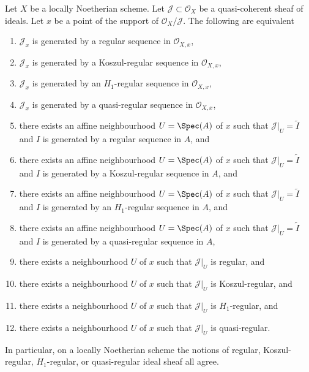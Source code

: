 \begin{lemma}
\label{lemma-Noetherian-scheme-regular-ideal}
Let $X$ be a locally Noetherian scheme. Let $\mathcal{J} \subset \mathcal{O}_X$
be a quasi-coherent sheaf of ideals. Let $x$ be a point of the support of
$\mathcal{O}_X/\mathcal{J}$. The following are equivalent
\begin{enumerate}
\item $\mathcal{J}_x$ is generated by a regular sequence in
$\mathcal{O}_{X, x}$,
\item $\mathcal{J}_x$ is generated by a Koszul-regular sequence in
$\mathcal{O}_{X, x}$,
\item $\mathcal{J}_x$ is generated by an $H_1$-regular sequence in
$\mathcal{O}_{X, x}$,
\item $\mathcal{J}_x$ is generated by a quasi-regular sequence in
$\mathcal{O}_{X, x}$,
\item there exists an affine neighbourhood $U = \Spec(A)$ of $x$ such
that $\mathcal{J}|_U = \widetilde{I}$ and $I$ is generated by a
regular sequence in $A$, and
\item there exists an affine neighbourhood $U = \Spec(A)$ of $x$ such
that $\mathcal{J}|_U = \widetilde{I}$ and $I$ is generated by a
Koszul-regular sequence in $A$, and
\item there exists an affine neighbourhood $U = \Spec(A)$ of $x$ such
that $\mathcal{J}|_U = \widetilde{I}$ and $I$ is generated by an
$H_1$-regular sequence in $A$, and
\item there exists an affine neighbourhood $U = \Spec(A)$ of $x$ such
that $\mathcal{J}|_U = \widetilde{I}$ and $I$ is generated by a
quasi-regular sequence in $A$,
\item there exists a neighbourhood $U$ of $x$ such that $\mathcal{J}|_U$
is regular, and
\item there exists a neighbourhood $U$ of $x$ such that $\mathcal{J}|_U$
is Koszul-regular, and
\item there exists a neighbourhood $U$ of $x$ such that $\mathcal{J}|_U$
is $H_1$-regular, and
\item there exists a neighbourhood $U$ of $x$ such that $\mathcal{J}|_U$
is quasi-regular.
\end{enumerate}
In particular, on a locally Noetherian scheme the notions of
regular, Koszul-regular, $H_1$-regular, or quasi-regular ideal sheaf all agree.
\end{lemma}

